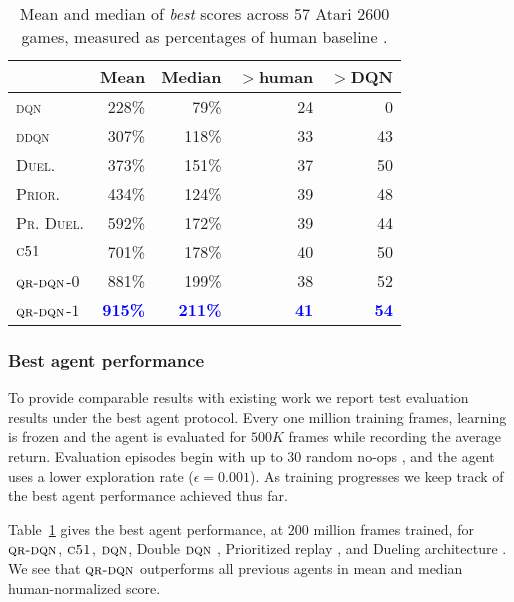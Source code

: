 \documentclass[letterpaper]{article}
\def \cfo {\textsc{c51}}
\def \dqn {\textsc{dqn}}
\def \qrdqn {\textsc{qr-dqn}}
\begin{document}
\begin{table}[ht]
\begin{center}
\begin{tabular}{ l | r | r | r | r }
\multicolumn{1}{c}{} & \mbox{\textbf{Mean}} & \mbox{\textbf{Median}} & $>$\mbox{\textbf{human}} & $>$\mbox{\textbf{DQN}} \\
\hline
\textsc{dqn}  &   228\% & 79\% & 24 & 0 \\
\textsc{ddqn}   &   307\% & 118\% & 33 & 43 \\
\textsc{Duel.}   &   373\% & 151\% & 37 & 50 \\
\textsc{Prior.}   &   434\% & 124\% & 39 & 48 \\
\textsc{Pr. Duel.}   &   592\% & 172\% & 39 & 44 \\
\hline
\hline
$\cfo$   &   701\% & 178\% & 40 & 50 \\
\hline
$\qrdqn$-$0$   &   881\% & 199\% & 38 & 52 \\
$\qrdqn$-$1$   &   \textbf{\textcolor{blue}{915\%}} & \textbf{\textcolor{blue}{211\%}} & \textbf{\textcolor{blue}{41}} & \textbf{\textcolor{blue}{54}} \\
\end{tabular}
\end{center}
\caption{Mean and median of \textit{best} scores across 57 Atari 2600 games, measured as percentages of human baseline \cite{nair15massively}.}
\label{fig:perc_scores}
\end{table}


\subsubsection{Best agent performance}

To provide comparable results with existing work we report test evaluation results under the best agent protocol. Every one million training frames, learning is frozen and the agent is evaluated for $500K$ frames while recording the average return. Evaluation episodes begin with up to $30$ random no-ops \cite{mnih15nature}, and the agent uses a lower exploration rate ($\epsilon = 0.001$). As training progresses we keep track of the best agent performance achieved thus far.

Table~\ref{fig:perc_scores} gives the best agent performance, at $200$ million frames trained, for $\qrdqn$, $\cfo$, $\dqn$, Double $\dqn$ \cite{vanhasselt16deep}, Prioritized replay \cite{schaul16prioritized}, and Dueling architecture \cite{wang2016dueling}. We see that $\qrdqn$ outperforms all previous agents in mean and median human-normalized score. 
\end{document}
